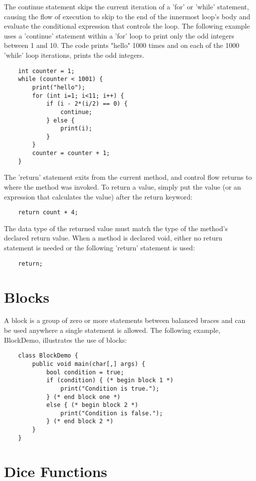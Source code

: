 \begin{homeworkProblem}
	The continue statement skips the current iteration of a 'for' or 'while' statement, causing the flow of execution to skip to the end of the innermost loop's body and evaluate the conditional expression that controls the loop.
	The following example uses a 'continue' statement within a 'for' loop to print only the odd integers between 1 and 10. The code prints "hello" 1000 times and on each of the 1000 'while' loop iterations, prints the odd integers.
	
	\begin{verbatim} 
	int counter = 1;
	while (counter < 1001) {
		print("hello");
		for (int i=1; i<11; i++) {
			if (i - 2*(i/2) == 0) {
				continue;
			} else {
				print(i);
			}
		}
		counter = counter + 1;
	}
	\end{verbatim}
	
	
	The 'return' statement exits from the current method, and control flow returns to where the method was invoked. To return a value, simply put the value (or an expression that calculates the value) after the return keyword:
	\begin{verbatim} 
	return count + 4;
	\end{verbatim}
	
	The data type of the returned value must match the type of the method's declared return value. When a method is declared void, either no return statement is needed or the following 'return' statement is used:
	
	\begin{verbatim} 
	return;
	\end{verbatim}
	
	\section{Blocks}
	
	A block is a group of zero or more statements between balanced braces and can be used anywhere a single statement is allowed. The following example, BlockDemo, illustrates the use of blocks:
	
	\begin{verbatim} 
	class BlockDemo {
		public void main(char[,] args) {
			bool condition = true;
			if (condition) { (* begin block 1 *)
				print("Condition is true.");
			} (* end block one *)
			else { (* begin block 2 *)
				print("Condition is false.");
			} (* end block 2 *)
		}
	}
	\end{verbatim}
	
	\section{Dice Functions}
	

\end{homeworkProblem}
